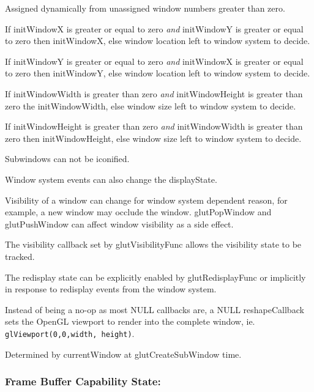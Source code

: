 {\footnotesize
\begin{description}
\itemsep 0in
\item[\takeNote]  Assigned dynamically from unassigned window numbers greater than zero.
\item[\takeNote]  If initWindowX is greater or equal to zero {\em and}
initWindowY is greater or equal to zero then initWindowX, else
window location left to window system to decide.
\item[\takeNote]  If initWindowY is greater or equal to zero {\em and}
initWindowX is greater or equal to zero then initWindowY, else
window location left to window system to decide.
\item[\takeNote]  If initWindowWidth is greater than zero {\em and} initWindowHeight is greater than zero
the initWindowWidth, else
window size left to window system to decide.
\item[\takeNote]  If initWindowHeight is greater than zero {\em and} initWindowWidth is greater than zero
then initWindowHeight, else
window size left to window system to decide.
\item[\takeNote]  Subwindows can not be iconified.
\item[\takeNote]  Window system events can also change the displayState.
\item[\takeNote]  Visibility of a window can change for window system dependent reason, for
  example, a new window may occlude the window.  glutPopWindow and glutPushWindow can
  affect window visibility as a side effect.
\item[\takeNote]  The visibility callback set by glutVisibilityFunc allows the visibility state to be tracked.
\item[\takeNote]  The redisplay state can be explicitly enabled by glutRedisplayFunc or
  implicitly in response to redisplay events from the window system.
\item[\takeNote]  Instead of being a no-op as most NULL callbacks are, a NULL reshapeCallback
sets the OpenGL viewport to render into the complete window, ie. {\tt glViewport(0,0,width, height)}.
\item[\takeNote]  Determined by currentWindow at glutCreateSubWindow time.
\end{description}
}

\subsubsection{Frame Buffer Capability State:}

